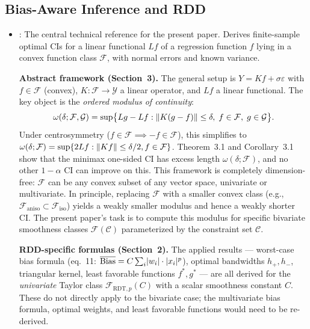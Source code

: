 \subsection{Bias-Aware Inference and RDD}\label{sec:lit:rdd}

\begin{itemize}
	\item \textcite{armstrong_optimal_2018}: The central technical reference for the present paper.
	Derives finite-sample optimal CIs for a linear functional $Lf$ of a regression function $f$ lying in a convex function class $\mathcal{F}$, with normal errors and known variance.

	\textbf{Abstract framework (Section~3).}
	The general setup is $Y = Kf + \sigma\varepsilon$ with $f \in \mathcal{F}$ (convex), $K \colon \mathcal{F} \to \mathcal{Y}$ a linear operator, and $Lf$ a linear functional.
	The key object is the \emph{ordered modulus of continuity}:
	\begin{equation*}
		\omega(\delta; \mathcal{F}, \mathcal{G}) = \sup\bigl\{Lg - Lf : \lVert K(g - f)\rVert \leq \delta,\; f \in \mathcal{F},\; g \in \mathcal{G}\bigr\}.
	\end{equation*}
	Under centrosymmetry ($f \in \mathcal{F} \implies -f \in \mathcal{F}$), this simplifies to $\omega(\delta; \mathcal{F}) = \sup\{2Lf : \lVert Kf\rVert \leq \delta/2, f \in \mathcal{F}\}$.
	Theorem~3.1 and Corollary~3.1 show that the minimax one-sided CI has excess length $\omega(\delta; \mathcal{F})$, and no other $1-\alpha$ CI can improve on this.
	This framework is completely dimension-free: $\mathcal{F}$ can be any convex subset of any vector space, univariate or multivariate.
	In principle, replacing $\mathcal{F}$ with a smaller convex class (e.g., $\mathcal{F}_{\mathrm{aniso}} \subset \mathcal{F}_{\mathrm{iso}}$) yields a weakly smaller modulus and hence a weakly shorter CI.
	The present paper's task is to compute this modulus for specific bivariate smoothness classes $\mathcal{F}(\mathcal{C})$ parameterized by the constraint set $\mathcal{C}$.

	\textbf{RDD-specific formulas (Section~2).}
	The applied results --- worst-case bias formula (eq.~11: $\overline{\mathrm{Bias}} = C \sum_i \lvert w_i\rvert \cdot \lvert x_i\rvert^p$), optimal bandwidths $h_+, h_-$, triangular kernel, least favorable functions $f^*, g^*$ --- are all derived for the \emph{univariate} Taylor class $\mathcal{F}_{\mathrm{RDT},p}(C)$ with a scalar smoothness constant $C$.
	These do not directly apply to the bivariate case; the multivariate bias formula, optimal weights, and least favorable functions would need to be re-derived.


\end{itemize}
